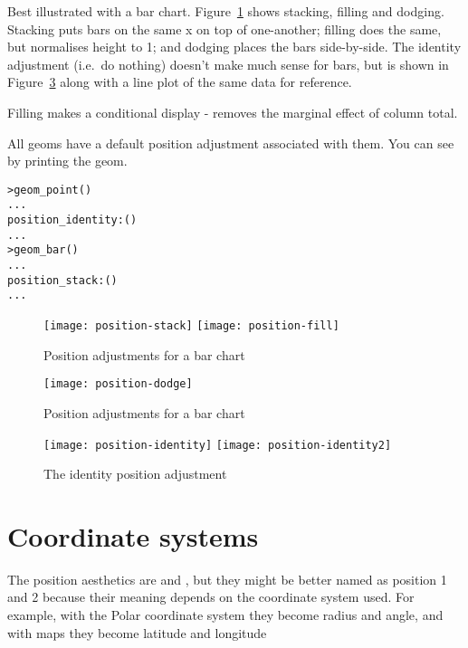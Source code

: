Best illustrated with a bar chart.  Figure~\ref{fig:position-bar} shows stacking, filling and dodging.  Stacking puts bars on the same x on top of one-another; filling does the same, but normalises height to 1; and dodging places the bars side-by-side.  The identity adjustment (i.e.\ do nothing) doesn't make much sense for bars, but is shown in Figure~\ref{fig:position-identity} along with a line plot of the same data for reference.

Filling makes a conditional display - removes the marginal effect of column total. 

All geoms have a default position adjustment associated with them.  You can see by printing the geom.

\begin{alltt}
  > geom_point()
  ...
  position_identity: ()
  ...
  > geom_bar()
  ...
  position_stack: ()
  ...
\end{alltt}

\begin{figure}[htbp]
  \centering
    \texttt{[image: position-stack]}%
    \texttt{[image: position-fill]}
  \caption{Position adjustments for a bar chart}
  \label{fig:position-bar}
\end{figure}

\begin{figure}[htbp]
  \centering
    \texttt{[image: position-dodge]}
  \caption{Position adjustments for a bar chart}
  \label{fig:position-dodge}
\end{figure}

\begin{figure}[htbp]
  \centering
    \texttt{[image: position-identity]}%
    \texttt{[image: position-identity2]}
  \caption{The identity position adjustment}
  \label{fig:position-identity}
\end{figure}


\section{Coordinate systems}
\label{sec:coord}

The position aesthetics are  and , but they might be better named as position 1 and 2 because their meaning depends on the coordinate system used.  For example, with the Polar coordinate system they become radius and angle, and with maps they become latitude and longitude

